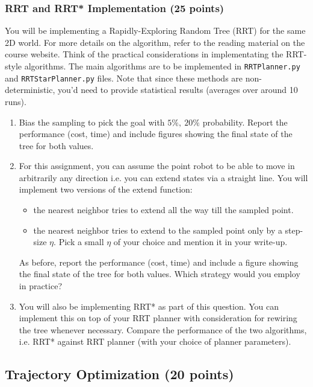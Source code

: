 \documentclass{article}
\newcommand{\?}{\stackrel{?}{=}}
\begin{document}
\subsubsection{RRT and RRT* Implementation (25 points)}

You will be implementing a Rapidly-Exploring Random Tree (RRT) for the same 2D world. For more details on the algorithm, refer to the reading material on the course website. Think of the practical considerations in implementating the RRT-style algorithms. The main algorithms are to be implemented in \texttt{RRTPlanner.py} and \texttt{RRTStarPlanner.py} files. Note that since these methods are non-deterministic, you'd need to provide statistical results (averages over around 10 runs).

\begin{enumerate}
\item Bias the sampling to pick the goal with $5\%,~20\%$ probability. Report the performance (cost, time) and include figures showing the final state of the tree for both values.

\item For this assignment, you can assume the point robot to be able to move in arbitrarily any direction i.e. you can extend states via a straight line. You will implement two versions of the extend function:
	\begin{itemize}
		\item the nearest neighbor tries to extend all the way till the sampled point.
		\item the nearest neighbor tries to extend to the sampled point only by a step-size $\eta$. Pick a small $\eta$ of your choice and mention it in your write-up.
	\end{itemize}
As before, report the performance (cost, time) and include a figure showing the final state of the tree for both values. Which strategy would you employ in practice?

\item You will also be implementing RRT* as part of this question. You can implement this on top of your RRT planner with consideration for rewiring the tree whenever necessary. Compare the performance of the two algorithms, i.e. RRT* against RRT planner (with your choice of planner parameters).
\end{enumerate}

\subsection{Trajectory Optimization (20 points)}
\end{document}
